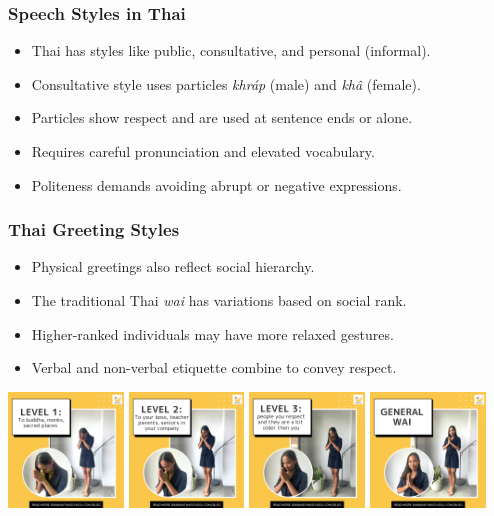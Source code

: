 \documentclass[xetex]{beamer}
\begin{document}
\begin{frame}
\frametitle{Speech Styles in Thai}
\begin{itemize}
    \item Thai has styles like public, consultative, and personal (informal).
    \item Consultative style uses particles \textit{khráp} (male) and \textit{khâ} (female).
    \item Particles show respect and are used at sentence ends or alone.
    \item Requires careful pronunciation and elevated vocabulary.
    \item Politeness demands avoiding abrupt or negative expressions.
\end{itemize}
\end{frame}

\begin{frame}
\frametitle{Thai Greeting Styles}
\begin{itemize}
    \item Physical greetings also reflect social hierarchy.
    \item The traditional Thai \textit{wai} has variations based on social rank.
    \item Higher-ranked individuals may have more relaxed gestures.
    \item Verbal and non-verbal etiquette combine to convey respect.
\end{itemize}
\begin{center}
\includegraphics[width=0.23\textwidth]{pics/wai-1.png}
\includegraphics[width=0.23\textwidth]{pics/wai-2.png}
\includegraphics[width=0.23\textwidth]{pics/wai-3.png}
\includegraphics[width=0.23\textwidth]{pics/wai-4.png}
\end{center}
\end{frame}
\end{document}
